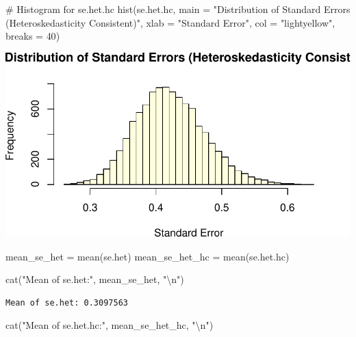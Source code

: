 \documentclass[
  11pt,
]{article}
\newenvironment{Shaded}{\begin{snugshade}}{\end{snugshade}}
\newcommand{\AttributeTok}[1]{\textcolor[rgb]{0.40,0.45,0.13}{#1}}
\newcommand{\CommentTok}[1]{\textcolor[rgb]{0.37,0.37,0.37}{#1}}
\newcommand{\DecValTok}[1]{\textcolor[rgb]{0.68,0.00,0.00}{#1}}
\newcommand{\FunctionTok}[1]{\textcolor[rgb]{0.28,0.35,0.67}{#1}}
\newcommand{\NormalTok}[1]{\textcolor[rgb]{0.00,0.23,0.31}{#1}}
\newcommand{\OtherTok}[1]{\textcolor[rgb]{0.00,0.23,0.31}{#1}}
\newcommand{\SpecialCharTok}[1]{\textcolor[rgb]{0.37,0.37,0.37}{#1}}
\newcommand{\StringTok}[1]{\textcolor[rgb]{0.13,0.47,0.30}{#1}}
\begin{document}
\begin{Shaded}
\begin{Highlighting}[]
\CommentTok{\# Histogram for se.het.hc}
\FunctionTok{hist}\NormalTok{(se.het.hc, }\AttributeTok{main =} \StringTok{"Distribution of Standard Errors (Heteroskedasticity Consistent)"}\NormalTok{, }\AttributeTok{xlab =} \StringTok{"Standard Error"}\NormalTok{, }\AttributeTok{col =} \StringTok{"lightyellow"}\NormalTok{, }\AttributeTok{breaks =} \DecValTok{40}\NormalTok{)}
\end{Highlighting}
\end{Shaded}

\includegraphics{HW-4-CODE-and-ANSWERS_files/figure-pdf/unnamed-chunk-17-5.pdf}

\begin{Shaded}
\begin{Highlighting}[]
\NormalTok{mean\_se\_het }\OtherTok{=} \FunctionTok{mean}\NormalTok{(se.het)}
\NormalTok{mean\_se\_het\_hc }\OtherTok{=} \FunctionTok{mean}\NormalTok{(se.het.hc)}

\FunctionTok{cat}\NormalTok{(}\StringTok{"Mean of se.het:"}\NormalTok{, mean\_se\_het, }\StringTok{"}\SpecialCharTok{\textbackslash{}n}\StringTok{"}\NormalTok{)}
\end{Highlighting}
\end{Shaded}

\begin{verbatim}
Mean of se.het: 0.3097563 
\end{verbatim}

\begin{Shaded}
\begin{Highlighting}[]
\FunctionTok{cat}\NormalTok{(}\StringTok{"Mean of se.het.hc:"}\NormalTok{, mean\_se\_het\_hc, }\StringTok{"}\SpecialCharTok{\textbackslash{}n}\StringTok{"}\NormalTok{)}
\end{Highlighting}
\end{Shaded}
\end{document}
